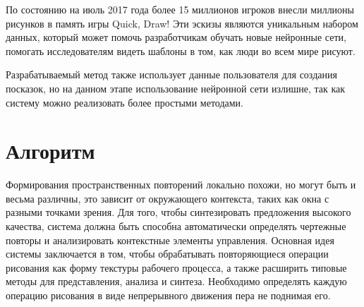 По состоянию на июль 2017 года более 15 миллионов игроков внесли миллионы рисунков в память игры Quick, Draw! Эти эскизы являются уникальным набором данных, который может помочь разработчикам обучать новые нейронные сети, помогать исследователям видеть шаблоны в том, как люди во всем мире рисуют.

Разрабатываемый метод также использует данные пользователя для создания посказок, но на данном этапе использование нейронной сети излишне, так как систему можно реализовать более простыми методами.

\section{Алгоритм}
Формирования пространственных повторений локально похожи, но могут быть и весьма различны, это зависит от окружающего контекста, таких как окна с разными точками зрения. Для того, чтобы синтезировать предложения высокого качества, система должна быть способна автоматически определять чертежные повторы и анализировать контекстные элементы управления.
Основная идея системы заключается в том, чтобы обрабатывать повторяющиеся операции рисования как форму текстуры рабочего процесса, а также расширить типовые методы для представления, анализа и синтеза. Необходимо определять каждую операцию рисования в виде непрерывного движения пера не поднимая его. 




